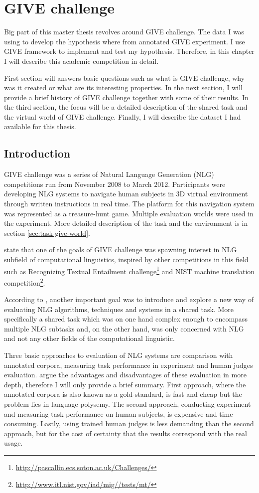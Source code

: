 \chapter{GIVE challenge}
Big part of this master thesis revolves around GIVE challenge. The data I was using to develop the hypothesis where from annotated GIVE experiment. I use GIVE framework to implement and test my hypothesis. Therefore, in this chapter I will describe this academic competition in detail.  

First section will answers basic questions such as what is GIVE challenge, why was it created or what are its interesting properties. In the next section, I will provide a brief history of GIVE challenge together with some of their results. In the third section, the focus will be a detailed description of the shared task and the virtual world of GIVE challenge. Finally, I will describe the dataset I had available for this thesis.

\section{Introduction}
GIVE challenge was a series of Natural Language Generation (NLG) competitions run from November 2008 to March 2012. Participants were developing NLG systems to navigate human subjects in 3D virtual environment through written instructions in real time. The platform for this navigation system was represented as a treasure-hunt game. Multiple evaluation worlds were used in the experiment. More detailed description of the task and the environment is in section \ref{sec:task-give-world}.

\citep{koller2010first} state that one of the goals of GIVE challenge was spawning interest in NLG subfield of computational linguistics, inspired by other competitions in this field such as Recognizing Textual Entailment challenge\footnote{\url{http://pascallin.ecs.soton.ac.uk/Challenges/}} and NIST machine
translation competition\footnote{\url{http://www.itl.nist.gov/iad/mig//tests/mt/}}.

According to \citep{koller2010first}, another important goal was to introduce and explore a new way of evaluating NLG algorithms, techniques and systems in a shared task. More specifically a shared task which was on one hand complex enough to encompass multiple NLG subtasks and, on the other hand, was only concerned with NLG and not any other fields of the computational linguistic.

Three basic approaches to evaluation of NLG systems are comparison with annotated corpora, measuring task performance in experiment and human judges evaluation. \citep{koller2010first} argue the advantages and disadvantages of these evaluation in more depth, therefore I will only provide a brief summary. First approach, where the annotated corpora is also known as a gold-standard, is fast and cheap but the problem lies in language polysemy. The second approach, conducting experiment and measuring task performance on human subjects, is expensive and time consuming. Lastly, using trained human judges is less demanding than the second approach, but for the cost of certainty that the results correspond with the real usage.

